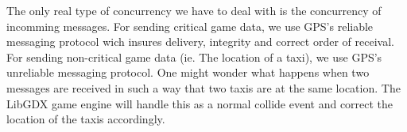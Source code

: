 The only real type of concurrency we have to deal with is the concurrency of incomming messages. For sending critical game data, we use GPS's reliable messaging protocol wich insures delivery, integrity and correct order of receival. For sending non-critical game data (ie. The location of a taxi),  we use GPS's unreliable messaging protocol. One might wonder what happens when two messages are received in such a way that two taxis are at the same location. The LibGDX game engine will handle this as a normal collide event and correct the location of the taxis accordingly.